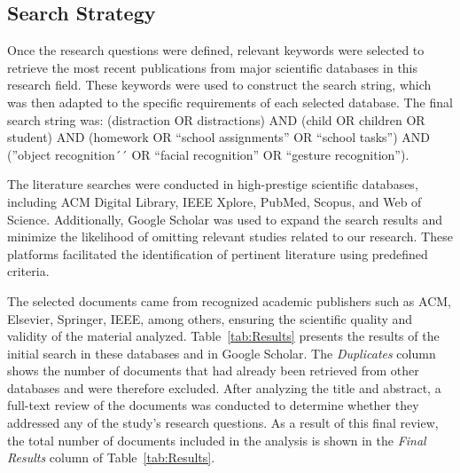 		\subsection{Search Strategy}
			Once the research questions were defined, relevant keywords were selected to retrieve the most recent publications from major scientific databases in this research field. These keywords were used to construct the search string, which was then adapted to the specific requirements of each selected database. The final search string was: (distraction OR distractions) AND (child OR children OR student) AND (homework OR ``school assignments'' OR ``school tasks'') AND (''object recognition´´ OR ``facial recognition'' OR ``gesture recognition'').
			
			The literature searches were conducted in high-prestige scientific databases, including ACM Digital Library, IEEE Xplore, PubMed, Scopus, and Web of Science. Additionally, Google Scholar was used to expand the search results and minimize the likelihood of omitting relevant studies related to our research. These platforms facilitated the identification of pertinent literature using predefined criteria.
			
			The selected documents came from recognized academic publishers such as ACM, Elsevier, Springer, IEEE, among others, ensuring the scientific quality and validity of the material analyzed. Table~\ref{tab:Results} presents the results of the initial search in these databases and in Google Scholar. The \textit{Duplicates} column shows the number of documents that had already been retrieved from other databases and were therefore excluded. After analyzing the title and abstract, a full-text review of the documents was conducted to determine whether they addressed any of the study's research questions. As a result of this final review, the total number of documents included in the analysis is shown in the \textit{Final Results} column of Table~\ref{tab:Results}.
			

